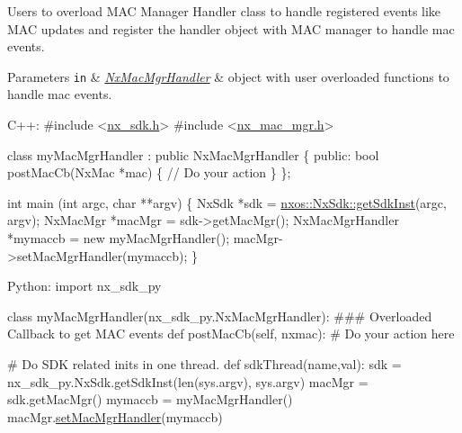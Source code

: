 Users to overload M\+AC Manager Handler class to handle registered events like M\+AC updates and register the handler object with M\+AC manager to handle mac events. 
\begin{DoxyParams}[1]{Parameters}
\mbox{\tt in}  & {\em \mbox{\hyperlink{classnxos_1_1_nx_mac_mgr_handler}{Nx\+Mac\+Mgr\+Handler}}} & object with user overloaded functions to handle mac events.\\
\hline
\end{DoxyParams}

\begin{DoxyCode}
C++:
\textcolor{preprocessor}{   #include <\mbox{\hyperlink{nx__sdk_8h}{nx\_sdk.h}}>}
\textcolor{preprocessor}{   #include <\mbox{\hyperlink{nx__mac__mgr_8h}{nx\_mac\_mgr.h}}>}

   \textcolor{keyword}{class }myMacMgrHandler : \textcolor{keyword}{public} NxMacMgrHandler \{
      \textcolor{keyword}{public}:
         \textcolor{keywordtype}{bool} postMacCb(NxMac *mac) \{
              \textcolor{comment}{// Do your action}
         \}
   \};

   \textcolor{keywordtype}{int}  main (\textcolor{keywordtype}{int} argc, \textcolor{keywordtype}{char} **argv)
   \{
        NxSdk    *sdk = \mbox{\hyperlink{classnxos_1_1_nx_sdk_a5050e2d26c40744b4fc7862068a83f39}{nxos::NxSdk::getSdkInst}}(argc, argv);
        NxMacMgr *macMgr = sdk->getMacMgr();
        NxMacMgrHandler *mymaccb = \textcolor{keyword}{new} myMacMgrHandler();
        macMgr->setMacMgrHandler(mymaccb);
   \}

Python:
   \textcolor{keyword}{import} nx\_sdk\_py

   \textcolor{keyword}{class }myMacMgrHandler(nx\_sdk\_py.NxMacMgrHandler):
\textcolor{preprocessor}{   ### Overloaded Callback to get MAC events}
         def postMacCb(self, nxmac):
\textcolor{preprocessor}{             # Do your action here}

\textcolor{preprocessor}{   # Do SDK related inits in one thread.}
   def sdkThread(name,val):
       sdk = nx\_sdk\_py.NxSdk.getSdkInst(len(sys.argv), sys.argv)
       macMgr = sdk.getMacMgr()
       mymaccb = myMacMgrHandler()
       macMgr.\mbox{\hyperlink{classnxos_1_1_nx_mac_mgr_a06f53bd41ddb17e6cfaef5a02b00415d}{setMacMgrHandler}}(mymaccb)
\end{DoxyCode}
 \mbox{\label{classnxos_1_1_nx_mac_mgr_aac2eae84327fa4a94616d214ac779fac}} 

